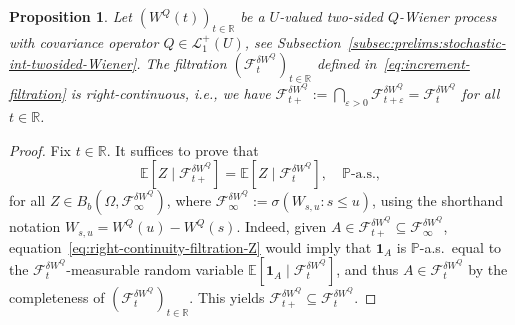 \documentclass[reqno]{amsart}
\numberwithin{equation}{section}
\newcommand{\bbP}{\mathbb{P}}
\newcommand{\bbR}{\mathbb{R}}
\newcommand{\R}{\mathbb{R}}
\newcommand{\E}{\mathbb{E}}
\newcommand{\cF}{\mathcal{F}}
\newcommand{\LO}{\mathscr L}
\newtheorem{proposition}[lemma]{Proposition}
\theoremstyle{remark}
\theoremstyle{definition}
\begin{document}
\begin{proposition}\label{prop:filtr-rightcont}
	Let $(W^Q(t))_{t\in\bbR}$ be a $U$-valued two-sided $Q$-Wiener process with covariance
	operator $Q \in \LO_1^+(U)$,
	see Subsection~\ref{subsec:prelims:stochastic-int-twosided-Wiener}.
	The filtration 
	$(\cF^{\delta W^Q}_t)_{t\in\bbR}$ defined in~\eqref{eq:increment-filtration}
	is right-continuous, i.e., we have $\cF_{t+}^{\delta W^Q} := \bigcap_{\varepsilon>0} \cF_{t+\varepsilon}^{\delta W^Q} = \cF_t^{\delta W^Q}$
	for all $t \in \bbR$.
\end{proposition}
\begin{proof}
	Fix $t \in \bbR$. 
	It suffices to prove that
	\begin{equation}\label{eq:right-continuity-filtration-Z}
		\E[Z \mid \cF^{\delta W^Q}_{t+}]
		=
		\E[Z \mid \cF^{\delta W^Q}_{t}],
		\quad
		\bbP\text{-a.s.},
	\end{equation}
	for all $Z \in B_b(\Omega, \cF_\infty^{\delta W^Q})$, where 
	$\cF_\infty^{\delta W^Q} := \sigma(W_{s,u} : s \le u)$,
	using the shorthand notation $W_{s,u} = W^Q(u) - W^Q(s)$.
	Indeed,
	given $A \in \cF_{t+}^{\delta W^Q} \subseteq \cF_\infty^{\delta W^Q}$,
	equation~\eqref{eq:right-continuity-filtration-Z} would imply that 
	$\mathbf 1_A$ is $\bbP$-a.s.\ equal to the $\cF_{t}^{\delta W^Q}$-measurable random variable
	$\E[\mathbf 1_A \mid \cF^{\delta W^Q}_{t}]$,
	and thus $A \in \cF_{t}^{\delta W^Q}$ by the completeness of $(\cF_t^{\delta W^Q})_{t\in\R}$.
	This yields $\cF_{t+}^{\delta W^Q} \subseteq \cF_{t}^{\delta W^Q}$\!.
	

\end{proof}
\end{document}
